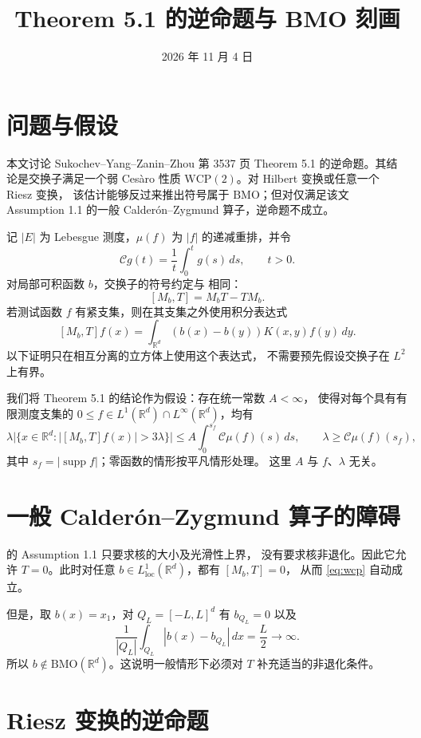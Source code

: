 \documentclass[UTF8,fontset=fandol,a4paper,11pt]{ctexart}
\title{Theorem 5.1 的逆命题与 BMO 刻画}
\author{}
\date{2026 年 11 月 4 日}
\newcommand{\R}{\mathbb R}
\newcommand{\BMO}{\mathrm{BMO}}
\newcommand{\supp}{\operatorname{supp}}
\newcommand{\C}{\mathcal C}
\begin{document}
\maketitle

\section{问题与假设}

本文讨论 Sukochev--Yang--Zanin--Zhou \cite{SYZZ} 第 3537 页
Theorem 5.1 的逆命题。其结论是交换子满足一个弱 Ces\`aro
性质 $\mathrm{WCP}(2)$。对 Hilbert 变换或任意一个 Riesz 变换，
该估计能够反过来推出符号属于 $\BMO$；但对仅满足该文
Assumption 1.1 的一般 Calder\'on--Zygmund 算子，逆命题不成立。

记 $|E|$ 为 Lebesgue 测度，$\mu(f)$ 为 $|f|$ 的递减重排，并令
\[
 \C g(t)=\frac1t\int_0^t g(s)\,ds,\qquad t>0.
\]
对局部可积函数 $b$，交换子的符号约定与 \cite{SYZZ} 相同：
\[
 [M_b,T]=M_bT-TM_b.
\]
若测试函数 $f$ 有紧支集，则在其支集之外使用积分表达式
\begin{equation}\label{eq:commutator}
 [M_b,T]f(x)
 =\int_{\R^d}(b(x)-b(y))K(x,y)f(y)\,dy.
\end{equation}
以下证明只在相互分离的立方体上使用这个表达式，
不需要预先假设交换子在 $L^2$ 上有界。

我们将 Theorem 5.1 的结论作为假设：存在统一常数 $A<\infty$，
使得对每个具有有限测度支集的
$0\le f\in L^1(\R^d)\cap L^\infty(\R^d)$，均有
\begin{equation}\label{eq:wcp}
 \lambda\bigl|\{x\in\R^d:|[M_b,T]f(x)|>3\lambda\}\bigr|
 \le A\int_0^{s_f}\C\mu(f)(s)\,ds,
 \qquad \lambda\ge\C\mu(f)(s_f),
\end{equation}
其中 $s_f=|\supp f|$；零函数的情形按平凡情形处理。
这里 $A$ 与 $f$、$\lambda$ 无关。

\section{一般 Calder\'on--Zygmund 算子的障碍}

\cite{SYZZ} 的 Assumption 1.1 只要求核的大小及光滑性上界，
没有要求核非退化。因此它允许 $T=0$。此时对任意
$b\in L^1_{\mathrm{loc}}(\R^d)$，都有 $[M_b,T]=0$，
从而 \eqref{eq:wcp} 自动成立。

但是，取 $b(x)=x_1$，对 $Q_L=[-L,L]^d$ 有 $b_{Q_L}=0$ 以及
\[
 \frac1{|Q_L|}\int_{Q_L}|b(x)-b_{Q_L}|\,dx=\frac L2
 \longrightarrow\infty.
\]
所以 $b\notin\BMO(\R^d)$。这说明一般情形下必须对 $T$
补充适当的非退化条件。

\section{Riesz 变换的逆命题}
\end{document}
